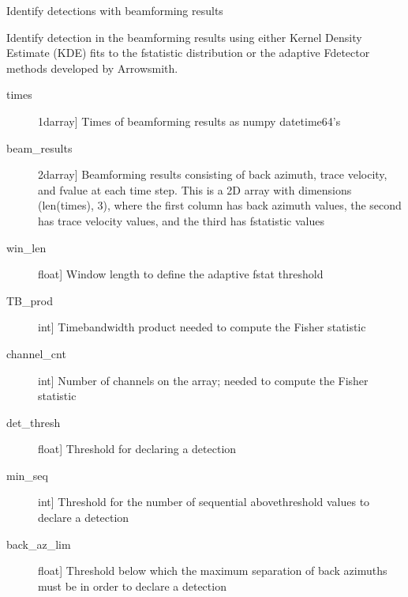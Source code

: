 \documentclass[letterpaper,10pt,english]{sphinxmanual}
\begin{document}

\begin{fulllineitems}
\label{\detokenize{infrapy.detection:infrapy.detection.beamforming_new.detect_signals}}
Identify detections with beamforming results

Identify detection in the beamforming results using either Kernel Density
Estimate (KDE) fits to the f\sphinxhyphen{}statistic distribution or the adaptive
F\sphinxhyphen{}detector methods developed by Arrowsmith.
\begin{description}
\item[{times}] \leavevmode{[}1darray{]}
Times of beamforming results as numpy datetime64’s

\item[{beam\_results}] \leavevmode{[}2darray{]}
Beamforming results consisting of back azimuth, trace velocity, and
f\sphinxhyphen{}value at each time step. This is a 2D array with dimensions (len(times), 3), 
where the first column has back azimuth values, the second has trace velocity 
values, and the third has f\sphinxhyphen{}statistic values

\item[{win\_len}] \leavevmode{[}float{]}
Window length to define the adaptive fstat threshold

\item[{TB\_prod}] \leavevmode{[}int{]}
Time\sphinxhyphen{}bandwidth product needed to compute the Fisher statistic

\item[{channel\_cnt}] \leavevmode{[}int{]}
Number of channels on the array; needed to compute the Fisher statistic

\item[{det\_thresh}] \leavevmode{[}float{]}
Threshold for declaring a detection

\item[{min\_seq}] \leavevmode{[}int{]}
Threshold for the number of sequential above\sphinxhyphen{}threshold values to declare
a detection

\item[{back\_az\_lim}] \leavevmode{[}float{]}
Threshold below which the maximum separation of back azimuths must be
in order to declare a detection


\end{description}
\end{fulllineitems}
\end{document}
